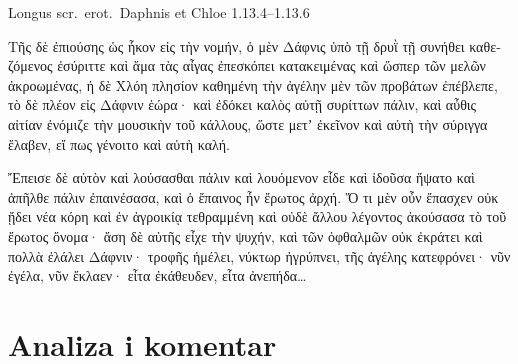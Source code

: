 Longus scr.~erot.\ Daphnis et Chloe 1.13.4–1.13.6


\medskip


{\large

\begin{greek}

\noindent Τῆς δὲ ἐπιούσης ὡς ἧκον εἰς τὴν νομήν, ὁ μὲν Δάφνις ὑπὸ τῇ δρυῒ τῇ συνήθει καθεζόμενος ἐσύριττε καὶ ἅμα τὰς αἶγας ἐπεσκόπει κατακειμένας καὶ ὥσπερ τῶν μελῶν ἀκροωμένας, ἡ δὲ Χλόη πλησίον καθημένη τὴν ἀγέλην μὲν τῶν προβάτων ἐπέβλεπε, τὸ δὲ πλέον εἰς Δάφνιν ἑώρα· καὶ ἐδόκει καλὸς αὐτῇ συρίττων πάλιν, καὶ αὖθις αἰτίαν ἐνόμιζε τὴν μουσικὴν τοῦ κάλλους, ὥστε μετʼ ἐκεῖνον καὶ αὐτὴ τὴν σύριγγα ἔλαβεν, εἴ πως γένοιτο καὶ αὐτὴ καλή.

Ἔπεισε δὲ αὐτὸν καὶ λούσασθαι πάλιν καὶ λουόμενον εἶδε καὶ ἰδοῦσα ἥψατο καὶ ἀπῆλθε πάλιν ἐπαινέσασα, καὶ ὁ ἔπαινος ἦν ἔρωτος ἀρχή. Ὅ τι μὲν οὖν ἔπασχεν οὐκ ᾔδει νέα κόρη καὶ ἐν ἀγροικίᾳ τεθραμμένη καὶ οὐδὲ ἄλλου λέγοντος ἀκούσασα τὸ τοῦ ἔρωτος ὄνομα· ἄση δὲ αὐτῆς εἶχε τὴν ψυχήν, καὶ τῶν ὀφθαλμῶν οὐκ ἐκράτει καὶ πολλὰ ἐλάλει Δάφνιν· τροφῆς ἠμέλει, νύκτωρ ἠγρύπνει, τῆς ἀγέλης κατεφρόνει· νῦν ἐγέλα, νῦν ἔκλαεν· εἶτα ἐκάθευδεν, εἶτα ἀνεπήδα\dots

\end{greek}

}


\section*{Analiza i komentar}


